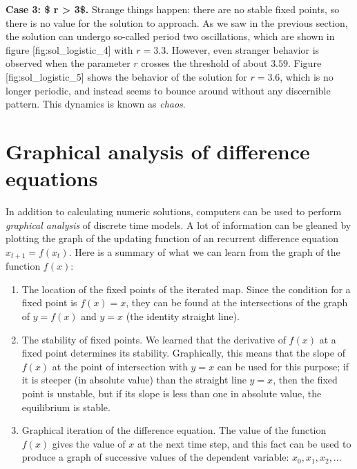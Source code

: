 \documentclass[
  letterpaper,
  DIV=11,
  numbers=noendperiod]{scrreprt}
\begin{document}
\textbf{Case 3: \$ r \textgreater{} 3\$.} Strange things happen: there
are no stable fixed points, so there is no value for the solution to
approach. As we saw in the previous section, the solution can undergo
so-called period two oscillations, which are shown in figure
{[}fig:sol\_logistic\_4{]} with \(r=3.3\). However, even stranger
behavior is observed when the parameter \(r\) crosses the threshold of
about \(3.59\). Figure {[}fig:sol\_logistic\_5{]} shows the behavior of
the solution for \(r=3.6\), which is no longer periodic, and instead
seems to bounce around without any discernible pattern. This dynamics is
known as \emph{chaos}.


\hypertarget{graphical-analysis-of-difference-equations}{%
\chapter{Graphical analysis of difference
equations}\label{graphical-analysis-of-difference-equations}}

In addition to calculating numeric solutions, computers can be used to
perform \emph{graphical analysis} of discrete time models. A lot of
information can be gleaned by plotting the graph of the updating
function of an recurrent difference equation \(x_{t+1} = f(x_t)\). Here
is a summary of what we can learn from the graph of the function
\(f(x)\):

\begin{tcolorbox}[enhanced jigsaw, colbacktitle=quarto-callout-tip-color!10!white, leftrule=.75mm, coltitle=black, left=2mm, breakable, opacityback=0, colback=white, toprule=.15mm, opacitybacktitle=0.6, bottomtitle=1mm, colframe=quarto-callout-tip-color-frame, rightrule=.15mm, bottomrule=.15mm, toptitle=1mm, titlerule=0mm, arc=.35mm, title={Graph of the updating function}]

\begin{enumerate}
\def\labelenumi{\arabic{enumi}.}
\item
  The location of the fixed points of the iterated map. Since the
  condition for a fixed point is \(f(x) = x\), they can be found at the
  intersections of the graph of \(y=f(x)\) and \(y=x\) (the identity
  straight line).
\item
  The stability of fixed points. We learned that the derivative of
  \(f(x)\) at a fixed point determines its stability. Graphically, this
  means that the slope of \(f(x)\) at the point of intersection with
  \(y=x\) can be used for this purpose; if it is steeper (in absolute
  value) than the straight line \(y=x\), then the fixed point is
  unstable, but if its slope is less than one in absolute value, the
  equilibrium is stable.
\item
  Graphical iteration of the difference equation. The value of the
  function \(f(x)\) gives the value of \(x\) at the next time step, and
  this fact can be used to produce a graph of successive values of the
  dependent variable: \(x_0, x_1, x_2, ...\)
\end{enumerate}

\end{tcolorbox}
\end{document}
